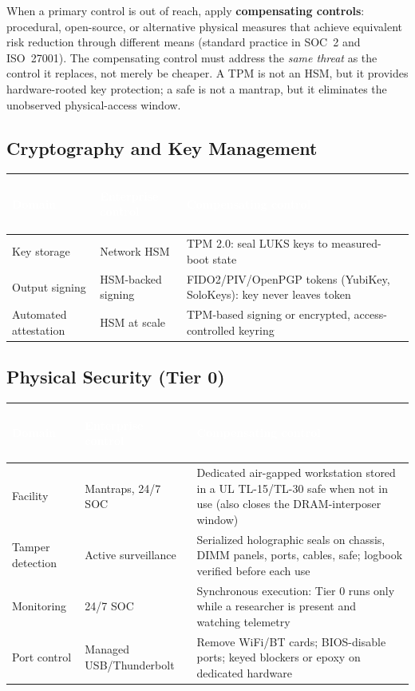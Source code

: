 \documentclass[11pt,letterpaper]{article}
\newcommand{\hrow}{\rowcolor{slategraphite}}
\newcommand{\hdr}[1]{\textcolor{white}{\bfseries\strut #1}}
\begin{document}
\begin{keybox}
When a primary control is out of reach, apply \textbf{compensating controls}: procedural, open-source, or alternative physical measures that achieve equivalent risk reduction through different means (standard practice in SOC~2 and ISO~27001). The compensating control must address the \emph{same threat} as the control it replaces, not merely be cheaper. A TPM is not an HSM, but it provides hardware-rooted key protection; a safe is not a mantrap, but it eliminates the unobserved physical-access window.
\end{keybox}

\subsection{Cryptography and Key Management}

\begin{longtable}{L{3.2cm} L{4.6cm} L{8.2cm}}
\hrow \hdr{Domain} & \hdr{Enterprise control} & \hdr{Compensating control} \\
\endhead
Key storage & Network HSM & TPM 2.0: seal LUKS keys to measured-boot state \\
Output signing & HSM-backed signing & FIDO2/PIV/OpenPGP tokens (YubiKey, SoloKeys): key never leaves token \\
Automated attestation & HSM at scale & TPM-based signing or encrypted, access-controlled keyring \\*
\bottomrule
\end{longtable}

\subsection{Physical Security (Tier 0)}

\begin{longtable}{L{3.2cm} L{4.6cm} L{8.2cm}}
\hrow \hdr{Domain} & \hdr{Enterprise control} & \hdr{Compensating control} \\
\endhead
Facility & Mantraps, 24/7 SOC & Dedicated air-gapped workstation stored in a UL TL-15/TL-30 safe when not in use (also closes the DRAM-interposer window) \\
Tamper detection & Active surveillance & Serialized holographic seals on chassis, DIMM panels, ports, cables, safe; logbook verified before each use \\
Monitoring & 24/7 SOC & Synchronous execution: Tier 0 runs only while a researcher is present and watching telemetry \\
Port control & Managed USB/Thunderbolt & Remove WiFi/BT cards; BIOS-disable ports; keyed blockers or epoxy on dedicated hardware \\*
\bottomrule
\end{longtable}
\end{document}
